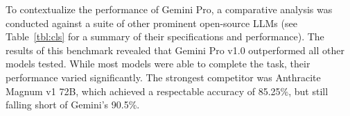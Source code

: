 To contextualize the performance of Gemini Pro, a comparative analysis was conducted against a suite of other prominent open-source LLMs (see Table~\ref{tbl:cls} for a summary of their specifications and performance). The results of this benchmark revealed that Gemini Pro v1.0 outperformed all other models tested. While most models were able to complete the task, their performance varied significantly. The strongest competitor was Anthracite Magnum v1 72B, which achieved a respectable accuracy of 85.25\%, but still falling short of Gemini's 90.5\%.
\begin{table*}[tb]
    \captionsetup{skip=5pt}
    \caption{Model Specifications and Performance}
    \label{tbl:cls}
    \centering
\end{table*}
